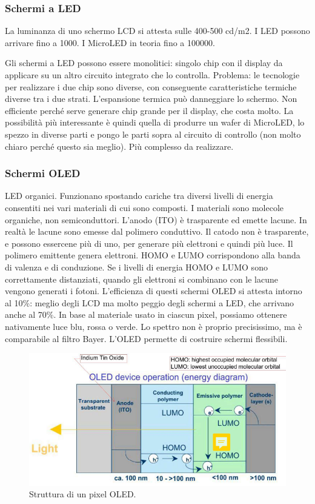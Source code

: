 \documentclass[a4paper,11pt]{article}
\begin{document}
\subsubsection{Schermi a LED}
La luminanza di uno schermo LCD si attesta sulle 400-500 cd/m2. I LED possono arrivare fino a 1000.
I MicroLED in teoria fino a 100000.
\par
Gli schermi a LED possono essere monolitici: singolo chip con il display da applicare su un altro circuito integrato che lo controlla.
Problema: le tecnologie per realizzare i due chip sono diverse, con conseguente caratteristiche termiche diverse tra i due strati.
L'espansione termica può danneggiare lo schermo. Non efficiente perché serve generare chip grande per il display, che costa molto.
La possibilità più interessante è quindi quella di produrre un wafer di MicroLED, lo spezzo in diverse parti e pongo le parti sopra al circuito di controllo (non molto chiaro perché questo sia meglio).
Più complesso da realizzare.

\subsubsection{Schermi OLED}
LED organici. Funzionano spostando cariche tra diversi livelli di energia consentiti nei vari materiali di cui sono composti. I materiali sono molecole organiche, non semiconduttori.
L'anodo (ITO) è trasparente ed emette lacune. In realtà le lacune sono emesse dal polimero conduttivo.
Il catodo non è trasparente, e possono essercene più di uno, per generare più elettroni e quindi più luce.
Il polimero emittente genera elettroni. HOMO e LUMO corrispondono alla banda di valenza e di conduzione.
Se i livelli di energia HOMO e LUMO sono correttamente distanziati, quando gli elettroni si combinano con le lacune
vengono generati i fotoni. L'efficienza di questi schermi OLED si attesta intorno al 10\%: meglio degli LCD ma molto peggio degli schermi a LED,
che arrivano anche al 70\%. In base al materiale usato in ciascun pixel, possiamo ottenere nativamente luce blu, rossa o verde. Lo spettro
non è proprio precisissimo, ma è comparabile al filtro Bayer. L'OLED permette di costruire schermi flessibili.

\renewcommand{\thefigure}{4.15}
\begin{figure}[!h]
  \centering
    \includegraphics[scale=0.4]{images/4/oled.png}
    \caption{Struttura di un pixel OLED.}
\end{figure}
\end{document}
